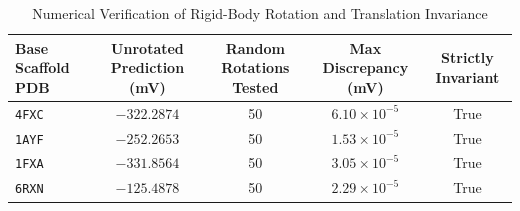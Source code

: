 \begin{table}[htbp]
\centering
\caption{Numerical Verification of Rigid-Body Rotation and Translation Invariance}
\label{tab:s3_invariance}
\small
\begin{tabular*}{\textwidth}{@{\extracolsep{\fill}}lcccc@{}}
\toprule
Base Scaffold PDB & Unrotated Prediction (mV) & Random Rotations Tested & Max Discrepancy (mV) & Strictly Invariant \\
\midrule
\texttt{4FXC} & $-322.2874$ & 50 & $6.10 \times 10^{-5}$ & True \\
\texttt{1AYF} & $-252.2653$ & 50 & $1.53 \times 10^{-5}$ & True \\
\texttt{1FXA} & $-331.8564$ & 50 & $3.05 \times 10^{-5}$ & True \\
\texttt{6RXN} & $-125.4878$ & 50 & $2.29 \times 10^{-5}$ & True \\
\bottomrule
\end{tabular*}
\end{table}
